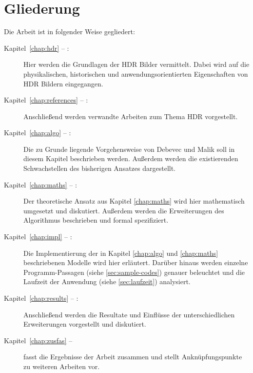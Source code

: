 \section{Gliederung}
Die Arbeit ist in folgender Weise gegliedert:
\begin{description}

\item[Kapitel~\autoref{chap:hdr} -- :] Hier werden die Grundlagen der \gls{HDR} Bilder vermittelt. Dabei wird auf die physikalischen, historischen und anwendungsorientierten Eigenschaften von \gls{HDR} Bildern eingegangen.

\item[Kapitel~\autoref{chap:references} -- :] Anschließend werden verwandte Arbeiten zum Thema \gls{HDR} vorgestellt.

\item[Kapitel~\autoref{chap:algo} -- :] Die zu Grunde liegende Vorgehensweise von Debevec und Malik \cite{paper} soll in diesem Kapitel beschrieben werden. Außerdem werden die existierenden Schwachstellen des bisherigen Ansatzes dargestellt.

\item[Kapitel~\autoref{chap:maths} -- :] Der theoretische Ansatz aus Kapitel \autoref{chap:maths} wird hier mathematisch umgesetzt und diskutiert. Außerdem werden die Erweiterungen des Algorithmus beschrieben und formal spezifiziert.

\item[Kapitel~\autoref{chap:impl} -- :] Die Implementierung der in Kapitel \autoref{chap:algo} und \autoref{chap:maths} beschriebenen Modelle wird hier erläutert. Darüber hinaus werden einzelne Programm-Passagen (siehe \autoref{sec:sample-codes}) genauer beleuchtet und die Laufzeit der Anwendung (siehe \autoref{sec:laufzeit}) analysiert.

\item[Kapitel~\autoref{chap:results} -- :] Anschließend werden die Resultate und Einflüsse der unterschiedlichen Erweiterungen vorgestellt und diskutiert.

\item[Kapitel~\autoref{chap:zusfas} -- ] fasst die Ergebnisse der Arbeit zusammen und stellt Anknüpfungspunkte zu weiteren Arbeiten vor.
\end{description}

